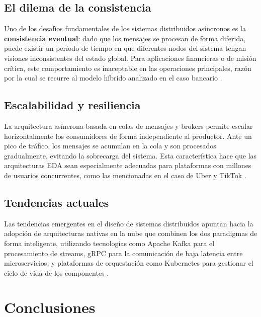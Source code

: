 \documentclass[12pt,a4paper]{article}
\begin{document}
\subsection{El dilema de la consistencia}
 
Uno de los desafíos fundamentales de los sistemas distribuidos asíncronos es la \textbf{consistencia eventual}: dado que los mensajes se procesan de forma diferida, puede existir un período de tiempo en que diferentes nodos del sistema tengan visiones inconsistentes del estado global. Para aplicaciones financieras o de misión crítica, este comportamiento es inaceptable en las operaciones principales, razón por la cual se recurre al modelo híbrido analizado en el caso bancario \cite{ref16}.
 
\subsection{Escalabilidad y resiliencia}
 
La arquitectura asíncrona basada en colas de mensajes y brokers permite escalar horizontalmente los consumidores de forma independiente al productor. Ante un pico de tráfico, los mensajes se acumulan en la cola y son procesados gradualmente, evitando la sobrecarga del sistema. Esta característica hace que las arquitecturas EDA sean especialmente adecuadas para plataformas con millones de usuarios concurrentes, como las mencionadas en el caso de Uber y TikTok \cite{ref13}.
 
\subsection{Tendencias actuales}
 
Las tendencias emergentes en el diseño de sistemas distribuidos apuntan hacia la adopción de arquitecturas nativas en la nube que combinen los dos paradigmas de forma inteligente, utilizando tecnologías como Apache Kafka para el procesamiento de streams, gRPC para la comunicación de baja latencia entre microservicios, y plataformas de orquestación como Kubernetes para gestionar el ciclo de vida de los componentes \cite{ref24}.
 
\section{Conclusiones}
 
\end{document}
